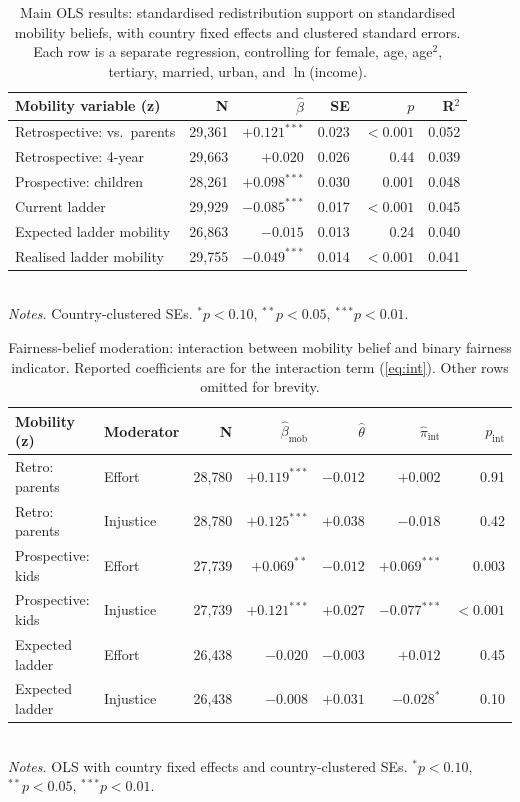 \documentclass[11pt,a4paper]{article}
\begin{document}
\begin{table}[!ht]
\small
\centering
\caption{Main OLS results: standardised redistribution support on standardised mobility
beliefs, with country fixed effects and clustered standard errors. Each row is a
separate regression, controlling for female, age, age$^2$, tertiary, married, urban,
and $\ln$(income).}
\label{tab:main}
\begin{tabular}{lrrrrr}
\toprule
Mobility variable (z) & N & $\hat\beta$ & SE & $p$ & R$^2$ \\
\midrule
Retrospective: vs.\ parents   & 29{,}361 & $+0.121^{***}$ & 0.023 & $<0.001$ & 0.052 \\
Retrospective: 4-year         & 29{,}663 & $+0.020$       & 0.026 & 0.44     & 0.039 \\
Prospective: children         & 28{,}261 & $+0.098^{***}$ & 0.030 & 0.001    & 0.048 \\
Current ladder                & 29{,}929 & $-0.085^{***}$ & 0.017 & $<0.001$ & 0.045 \\
Expected ladder mobility      & 26{,}863 & $-0.015$       & 0.013 & 0.24     & 0.040 \\
Realised ladder mobility      & 29{,}755 & $-0.049^{***}$ & 0.014 & $<0.001$ & 0.041 \\
\bottomrule
\end{tabular}
\\\footnotesize \emph{Notes.} Country-clustered SEs. $^{*}p<0.10$,
$^{**}p<0.05$, $^{***}p<0.01$.
\end{table}

\begin{table}[!ht]
\small
\centering
\caption{Fairness-belief moderation: interaction between mobility belief and
binary fairness indicator. Reported coefficients are for the interaction term
(\cref{eq:int}). Other rows omitted for brevity.}
\label{tab:int}
\begin{tabular}{llrrrrr}
\toprule
Mobility (z) & Moderator & N & $\hat\beta_{\text{mob}}$ & $\hat\theta$ &
$\hat\pi_{\text{int}}$ & $p_{\text{int}}$ \\
\midrule
Retro: parents     & Effort     & 28{,}780 & $+0.119^{***}$ & $-0.012$       & $+0.002$       & 0.91 \\
Retro: parents     & Injustice  & 28{,}780 & $+0.125^{***}$ & $+0.038$       & $-0.018$       & 0.42 \\
Prospective: kids  & Effort     & 27{,}739 & $+0.069^{**}$  & $-0.012$       & $+0.069^{***}$ & 0.003 \\
Prospective: kids  & Injustice  & 27{,}739 & $+0.121^{***}$ & $+0.027$       & $-0.077^{***}$ & $<0.001$ \\
Expected ladder    & Effort     & 26{,}438 & $-0.020$       & $-0.003$       & $+0.012$       & 0.45 \\
Expected ladder    & Injustice  & 26{,}438 & $-0.008$       & $+0.031$       & $-0.028^{*}$   & 0.10 \\
\bottomrule
\end{tabular}
\\\footnotesize \emph{Notes.} OLS with country fixed effects and country-clustered SEs.
$^{*}p<0.10$, $^{**}p<0.05$, $^{***}p<0.01$.
\end{table}
\end{document}
